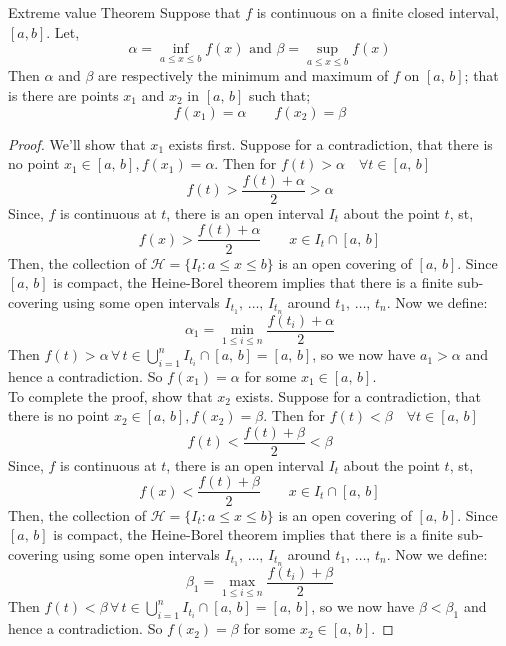 \documentclass{article}
\renewcommand{\a}{\alpha}
\renewcommand{\b}{\beta}
\begin{document}
\begin{theorem}{Extreme value Theorem}{}
  Suppose that $f$ is continuous on a finite closed interval, $[a, b]$. Let,
  $$ \a = \inf_{a\le x\le b}{f(x)}\text{ and } \b =\sup_{a\le x\le b}{f(x)} $$
  Then $\a$ and $\b$ are respectively the minimum and maximum of $f$ on $[a,\,b]$; that is there are points $x_1$ and $x_2$ in $[a,\,b]$ such that;
  $$ f(x_1) = \a \qquad f(x_2) = \b $$
\end{theorem}
\begin{proof}
  We'll show that $x_1$ exists first. Suppose for a contradiction, that there is no point $x_1 \in [a,\,b], f(x_1) = \a$. Then for $f(t) > \a\quad \forall t \in [a,\,b]$
  $$ f(t) > \frac{f(t) + \a}{2} > \a $$
  Since, $f$ is continuous at $t$, there is an open interval $I_t$ about the point $t$, st,
  $$ f(x) > \frac{f(t) + \a}{2} \qquad x\in I_t\cap[a,\, b] $$
  Then, the collection of $\displaystyle{\mathcal{H} = \{ I_t: a\le x \le b\}}$ is an open covering of $[a, \, b]$. Since $[a, \, b]$ is compact, the Heine-Borel theorem implies that there is a finite sub-covering using some open intervals $I_{t_1},\,\dots,\,I_{t_n}$ around $t_1,\,\dots,\,t_n$. Now we define:
  $$ \a_1 = \min_{1\le i \le n}{\frac{f(t_i) + \a}{2}} $$
  Then $f(t) > \a \,\forall \,t \in \bigcup_{i=1}^n{I_{t_i}\cap[a,\,b]} = [a,\,b]$, so we now have $a_1 >\a$ and hence a contradiction. So $f(x_1) = \a$ for some $x_1\in [a,\,b]$.\\

  \noindent
  To complete the proof, show that $x_2$ exists. Suppose for a contradiction, that there is no point $x_2 \in [a,\,b], f(x_2) = \b$. Then for $f(t) < \b\quad \forall t \in [a,\,b]$
  $$ f(t) < \frac{f(t) + \b}{2} < \b $$
  Since, $f$ is continuous at $t$, there is an open interval $I_t$ about the point $t$, st,
  $$ f(x) < \frac{f(t) + \b}{2} \qquad x\in I_t\cap[a,\, b] $$
  Then, the collection of $\displaystyle{\mathcal{H} = \{ I_t: a\le x \le b\}}$ is an open covering of $[a, \, b]$. Since $[a, \, b]$ is compact, the Heine-Borel theorem implies that there is a finite sub-covering using some open intervals $I_{t_1},\,\dots,\,I_{t_n}$ around $t_1,\,\dots,\,t_n$. Now we define:
  $$ \b_1 = \max_{1\le i \le n}{\frac{f(t_i) + \b}{2}} $$
  Then $f(t) < \b \,\forall \,t \in \bigcup_{i=1}^n{I_{t_i}\cap[a,\,b]} = [a,\,b]$, so we now have $\b <\b_1$ and hence a contradiction. So $f(x_2) = \b$ for some $x_2\in [a,\,b]$.
\end{proof}
\end{document}
